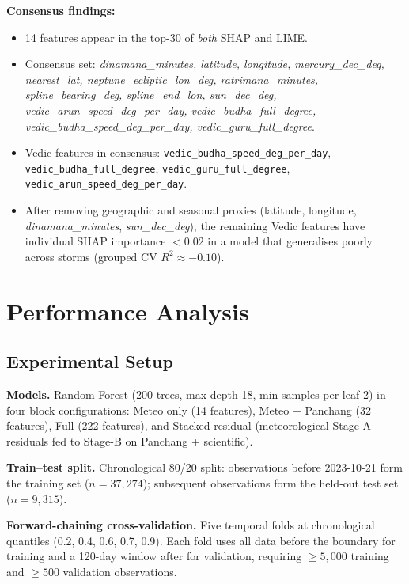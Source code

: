 \documentclass[12pt,a4paper]{article}
\begin{document}
\textbf{Consensus findings:}
\begin{itemize}[noitemsep]
  \item 14 features appear in the top-30 of \emph{both} SHAP and LIME.
  \item Consensus set: \textit{dinamana\_minutes, latitude, longitude,
        mercury\_dec\_deg, nearest\_lat, neptune\_ecliptic\_lon\_deg,
        ratrimana\_minutes, spline\_bearing\_deg, spline\_end\_lon,
        sun\_dec\_deg, vedic\_arun\_speed\_deg\_per\_day,
        vedic\_budha\_full\_degree, vedic\_budha\_speed\_deg\_per\_day,
        vedic\_guru\_full\_degree}.
  \item Vedic features in consensus: \texttt{vedic\_budha\_speed\_deg\_per\_day},
        \texttt{vedic\_budha\_full\_degree}, \texttt{vedic\_guru\_full\_degree},
        \texttt{vedic\_arun\_speed\_deg\_per\_day}.
  \item After removing geographic and seasonal proxies (latitude, longitude,
        \textit{dinamana\_minutes}, \textit{sun\_dec\_deg}), the remaining
        Vedic features have individual SHAP importance $< 0.02$ in a model
        that generalises poorly across storms (grouped CV $R^2 \approx -0.10$).
\end{itemize}

\section{Performance Analysis}
\label{sec:performance}

\subsection{Experimental Setup}

\textbf{Models.} Random Forest (200 trees, max depth 18, min samples per
leaf 2) in four block configurations: Meteo only (14 features),
Meteo + Panchang (32 features), Full (222 features), and Stacked residual
(meteorological Stage-A residuals fed to Stage-B on Panchang + scientific).

\textbf{Train--test split.} Chronological 80/20 split: observations before
2023-10-21 form the training set ($n = 37{,}274$); subsequent observations
form the held-out test set ($n = 9{,}315$).

\textbf{Forward-chaining cross-validation.} Five temporal folds at
chronological quantiles (0.2, 0.4, 0.6, 0.7, 0.9). Each fold uses all data
before the boundary for training and a 120-day window after for validation,
requiring $\geq 5{,}000$ training and $\geq 500$ validation observations.
\end{document}
